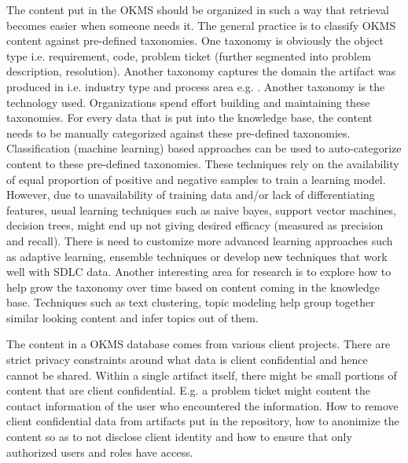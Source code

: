 The content put in the OKMS should be organized in such a way that retrieval becomes easier when someone needs it. The general practice is to classify OKMS content against pre-defined taxonomies. One taxonomy is obviously the object type i.e. requirement, code, problem ticket (further segmented into problem description, resolution). Another taxonomy captures the domain the artifact was produced in i.e. industry type and process area e.g. \cite{}. Another taxonomy is the technology used. Organizations spend effort building and maintaining these taxonomies. For every data that is put into the knowledge base, the content needs to be manually categorized against these pre-defined taxonomies. Classification (machine learning) based approaches can be used to auto-categorize content to these pre-defined taxonomies. These techniques rely on the availability of equal proportion of positive and negative samples to train a learning model. However, due to unavailability of training data and/or lack of differentiating features, usual learning techniques such as naive bayes, support vector machines, decision trees, might end up not giving desired efficacy (measured as precision and recall). There is need to customize more advanced learning approaches such as adaptive learning, ensemble techniques or develop new techniques that work well with SDLC data. Another interesting area for research is to explore how to help grow the taxonomy over time based on content coming in the knowledge base. Techniques such as text clustering, topic modeling \cite{} help group together similar looking content and infer topics out of them. 

The content in a OKMS database comes from various client projects. There are strict privacy constraints around what data is client confidential and hence cannot be shared. Within a single artifact itself, there might be small portions of content that are client confidential. E.g. a problem ticket might content the contact information of the user who encountered the information. How to remove client confidential data from artifacts put in the repository, how to anonimize the content so as to not disclose client identity and how to ensure that only authorized users and roles have access.

